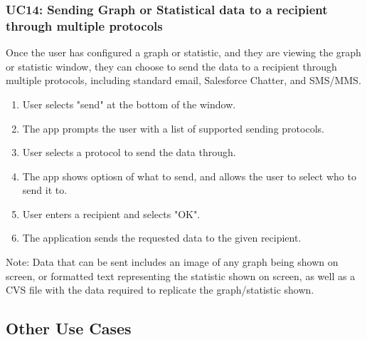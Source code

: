 \documentclass[12pt,oneside,letterpaper]{article}
\begin{document}
\subsubsection{\label{Sending a Graph image or Statistical Data to an email address}UC14: Sending Graph or Statistical data to a recipient through multiple protocols}
Once the user has configured a graph or statistic, and they are viewing the graph or statistic window, they can choose to send the data to a recipient through multiple protocols, including standard email, Salesforce Chatter, and SMS/MMS.
\begin{enumerate}
\item User selects "send" at the bottom of the window.
\item The app prompts the user with a list of supported sending protocols.
\item User selects a protocol to send the data through.
\item The app shows optiosn of what to send, and allows the user to select who to send it to.
\item User enters a recipient and selects "OK".
\item The application sends the requested data to the given recipient.
\end{enumerate}
Note: Data that can be sent includes an image of any graph being shown on screen, or formatted text representing the statistic shown on screen, as well as a CVS file with the data required to replicate the graph/statistic shown.


\subsection{Other Use Cases}
\end{document}
